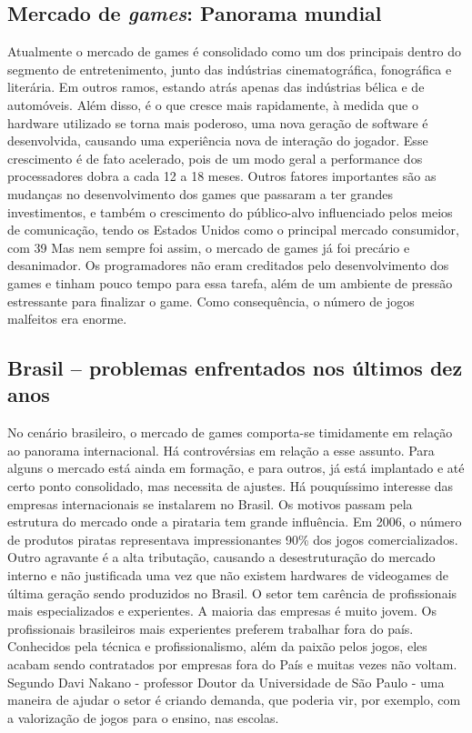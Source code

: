 \subsection{Mercado de \textit{games}: Panorama mundial}
%
Atualmente o mercado de games é consolidado como um dos principais dentro do segmento de entretenimento, junto das indústrias cinematográfica, fonográfica e literária. Em outros ramos, estando atrás apenas das indústrias bélica e de automóveis. Além disso, é o que cresce mais rapidamente, à medida que o hardware utilizado se torna mais poderoso, uma nova geração de software é desenvolvida, causando uma experiência nova de interação do jogador. 
Esse crescimento é de fato acelerado, pois de um modo geral a performance dos processadores dobra a cada 12 a 18 meses. Outros fatores importantes são as mudanças no desenvolvimento dos games que passaram a ter grandes investimentos, e também o crescimento do público-alvo influenciado pelos meios de comunicação, tendo os Estados Unidos como o principal mercado consumidor, com 39%
Mas nem sempre foi assim, o mercado de games já foi precário e desanimador. Os programadores não eram creditados pelo desenvolvimento dos games e tinham pouco tempo para essa tarefa, além de um ambiente de pressão estressante para finalizar o game. Como consequência, o número de jogos malfeitos era enorme. 
%
%
\subsection{Brasil – problemas enfrentados nos últimos dez anos}
%
No cenário brasileiro, o mercado de games comporta-se timidamente em relação ao panorama internacional. Há controvérsias em relação a esse assunto. Para alguns o mercado está ainda em formação, e para outros, já está implantado e até certo ponto consolidado, mas necessita de ajustes.
Há pouquíssimo interesse das empresas internacionais se instalarem no Brasil. Os motivos passam pela estrutura do mercado onde a pirataria tem grande influência. Em 2006, o número de produtos piratas representava impressionantes 90\% dos jogos comercializados. Outro agravante é a alta tributação, causando a desestruturação do mercado interno e não justificada uma vez que não existem hardwares de videogames de última geração sendo produzidos no Brasil. 
O setor tem carência de profissionais mais especializados e experientes. A maioria das empresas é muito jovem. Os profissionais brasileiros mais experientes preferem trabalhar fora do país. Conhecidos pela técnica e profissionalismo, além da paixão pelos jogos, eles acabam sendo contratados por empresas fora do País e muitas vezes não voltam.
Segundo Davi Nakano - professor Doutor da Universidade de São Paulo - uma maneira de ajudar o setor é criando demanda, que poderia vir, por exemplo, com a valorização de jogos para o ensino, nas escolas.
%
